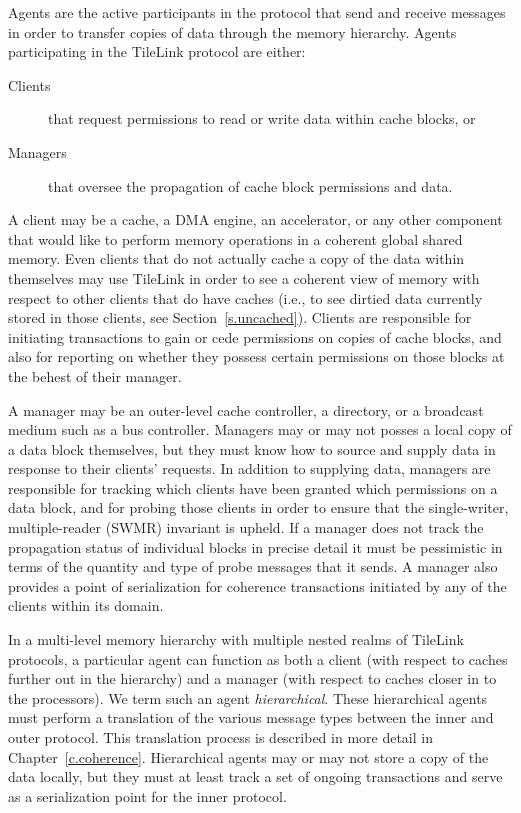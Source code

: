 Agents are the active participants in the protocol that send and receive messages in order to transfer copies of data through the memory hierarchy.
Agents participating in the TileLink protocol are either:
\begin{description}
\item[Clients] that request permissions to read or write data within cache blocks, or
\item[Managers] that oversee the propagation of cache block permissions and data.
\end{description}

A client may be a cache, a DMA engine, an accelerator, or any other component that would like to perform memory operations in a coherent global shared memory.
Even clients that do not actually cache a copy of the data within themselves may use TileLink in order to see a coherent view of memory with respect to other clients that do have caches
(i.e., to see dirtied data currently stored in those clients, see Section~\ref{s.uncached}).
Clients are responsible for initiating transactions to gain or cede permissions on copies of cache blocks, and also for reporting on whether they possess certain permissions on those blocks
at the behest of their manager.

A manager may be an outer-level cache controller, a directory, or a broadcast medium such as a bus controller.
Managers may or may not posses a local copy of a data block themselves, but they must know how to source and supply data in response to their clients' requests.
In addition to supplying data, managers are responsible for tracking which clients have been granted which permissions on a data block,
and for probing those clients in order to ensure that the 
single-writer, multiple-reader (SWMR) invariant \cite{sorin2011primer} is upheld.
If a manager does not track the propagation status of individual blocks in precise detail it must be pessimistic
in terms of the quantity and type of probe messages that it sends.
A manager also provides a point of serialization for coherence transactions
initiated by any of the clients within its domain.

In a multi-level memory hierarchy with multiple nested realms of TileLink protocols, a particular agent can function as both
a client (with respect to caches further out in the hierarchy)
and a manager (with respect to caches closer in to the processors).
We term such an agent {\em hierarchical}.
These hierarchical agents must perform a translation of the various message types between the inner and outer protocol.
This translation process is described in more detail in Chapter~\ref{c.coherence}.
Hierarchical agents may or may not store a copy of the data locally, but they must at least track a set of ongoing transactions and serve as a serialization point for the inner protocol.

